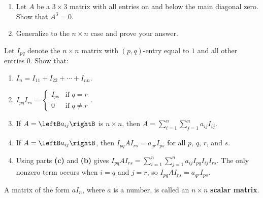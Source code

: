 \begin{multicols}{2}
\begin{supex}
\begin{enumerate}[label={\alph*.}]
\item Let $A$ be a $3 \times 3$ matrix with all entries on and below the main diagonal zero. Show that $A^{3} = 0$.

\item Generalize to the $n \times n$ case and prove your answer.

\end{enumerate}
\end{supex}

\begin{supex}\label{ex:ex2_suppl_6}
Let $I_{pq}$ denote the $n \times n$ matrix with $(p, q)$-entry equal to $1$ and all other entries $0$. Show that:


\begin{enumerate}[label={\alph*.}]
\item $I_{n} = I_{11} + I_{22} + \cdots  + I_{nn}$.

\item $I_{pq}I_{rs} = \left\lbrace \begin{array}{cl}
I_{ps} & \mbox{if } q = r \\
0 & \mbox{if } q \neq r
\end{array} \right.$.

\item If $A = \leftB a_{ij} \rightB$ is $n \times n$, then $A = \sum_{i=1}^{n} \sum_{j=1}^{n} a_{ij}I_{ij}$.


\item If $A = \leftB a_{ij} \rightB$, then $I_{pq}AI_{rs} = a_{qr}I_{ps}$ for all $p$, $q$, $r$, and $s$.

\end{enumerate}
\begin{supsol}
\begin{enumerate}[label={\alph*.}]
\setcounter{enumi}{3}
\item  Using parts \textbf{(c)} and \textbf{(b)} gives $I_{pq}AI_{rs} = \sum_{i=1}^{n} \sum_{j=1}^{n} a_{ij}I_{pq}I_{ij}I_{rs}$. The only nonzero term occurs when $i = q$ and $j = r$, so $I_{pq}AI_{rs} = a_{qr}I_{ps}$.

\end{enumerate}
\end{supsol}
\end{supex}

\begin{supex}
A matrix of the form $aI_{n}$, where $a$ is a number, is called an $n \times n$ \textbf{scalar matrix}.



\end{supex}
\end{multicols}
